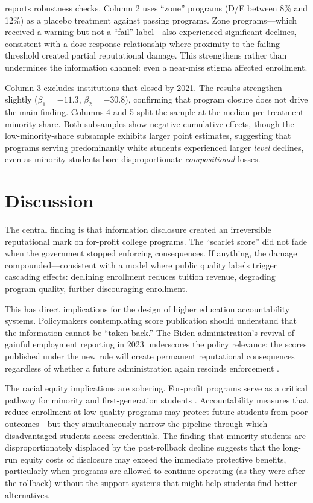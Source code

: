 \documentclass[12pt]{article}
\begin{document}


 reports robustness checks. Column 2 uses ``zone'' programs (D/E between 8\% and 12\%) as a placebo treatment against passing programs. Zone programs---which received a warning but not a ``fail'' label---also experienced significant declines, consistent with a dose-response relationship where proximity to the failing threshold created partial reputational damage. This strengthens rather than undermines the information channel: even a near-miss stigma affected enrollment.

Column 3 excludes institutions that closed by 2021. The results strengthen slightly ($\beta_1 = -11.3$, $\beta_2 = -30.8$), confirming that program closure does not drive the main finding. Columns 4 and 5 split the sample at the median pre-treatment minority share. Both subsamples show negative cumulative effects, though the low-minority-share subsample exhibits larger point estimates, suggesting that programs serving predominantly white students experienced larger \textit{level} declines, even as minority students bore disproportionate \textit{compositional} losses.

\section{Discussion}

The central finding is that information disclosure created an irreversible reputational mark on for-profit college programs. The ``scarlet score'' did not fade when the government stopped enforcing consequences. If anything, the damage compounded---consistent with a model where public quality labels trigger cascading effects: declining enrollment reduces tuition revenue, degrading program quality, further discouraging enrollment.

This has direct implications for the design of higher education accountability systems. Policymakers contemplating score publication should understand that the information cannot be ``taken back.'' The Biden administration's revival of gainful employment reporting in 2023 underscores the policy relevance: the scores published under the new rule will create permanent reputational consequences regardless of whether a future administration again rescinds enforcement \citep{kelchen2023gainful}.

The racial equity implications are sobering. For-profit programs serve as a critical pathway for minority and first-generation students \citep{deming2012for}. Accountability measures that reduce enrollment at low-quality programs may protect future students from poor outcomes---but they simultaneously narrow the pipeline through which disadvantaged students access credentials. The finding that minority students are disproportionately displaced by the post-rollback decline suggests that the long-run equity costs of disclosure may exceed the immediate protective benefits, particularly when programs are allowed to continue operating (as they were after the rollback) without the support systems that might help students find better alternatives.
\end{document}
